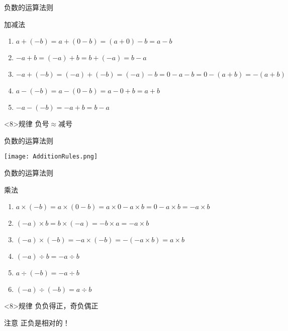 \begin{frame}{负数的运算法则}\pause
	\begin{block}{加减法}\pause
		\begin{enumerate}[<+- | alert@+>]
			\item $a + (-b) = a + (0-b) = (a + 0) - b = a - b$
			\item $-a + b = (-a) + b = b + (-a) = b - a$
			\item $ -a + (-b) = (-a) + (-b) = (-a) - b = 0 - a - b = 0 - (a + b) = -(a + b)$
			\item $a - (-b) = a - (0 - b) = a - 0 + b = a + b$
			\item $-a - (-b) = -a + b = b - a$
		\end{enumerate}
	\end{block}
	\begin{alertblock}{规律}
		\qquad 负号$\approx$减号
	\end{alertblock}
\end{frame}

\begin{frame}{负数的运算法则}
	\begin{center}
		\texttt{[image: AdditionRules.png]}
	\end{center}
\end{frame}

\begin{frame}{负数的运算法则}
	\begin{block}{乘法} \pause
		\begin{enumerate}[<+- | alert@+>]
			\item $a \times (-b) = a \times (0 - b) = a \times 0 - a \times b = 0 - a \times b = - a \times b$
			\item $(-a) \times b = b \times (-a) = - b \times a = - a \times b$
			\item $(-a) \times (-b) = - a \times (-b) = - (- a \times b) = a \times b$
			\item $(-a) \div b = - a \div b$
			\item $a \div (-b) = - a \div b$
			\item $(-a) \div (-b) = a \div b$
		\end{enumerate}
	\end{block}
	\begin{alertblock}{规律}
		\qquad 负负得正，奇负偶正
	\end{alertblock}
\end{frame}

\begin{frame}
	\begin{alertblock}{注意}
		正负是相对的！
	\end{alertblock}
\end{frame}